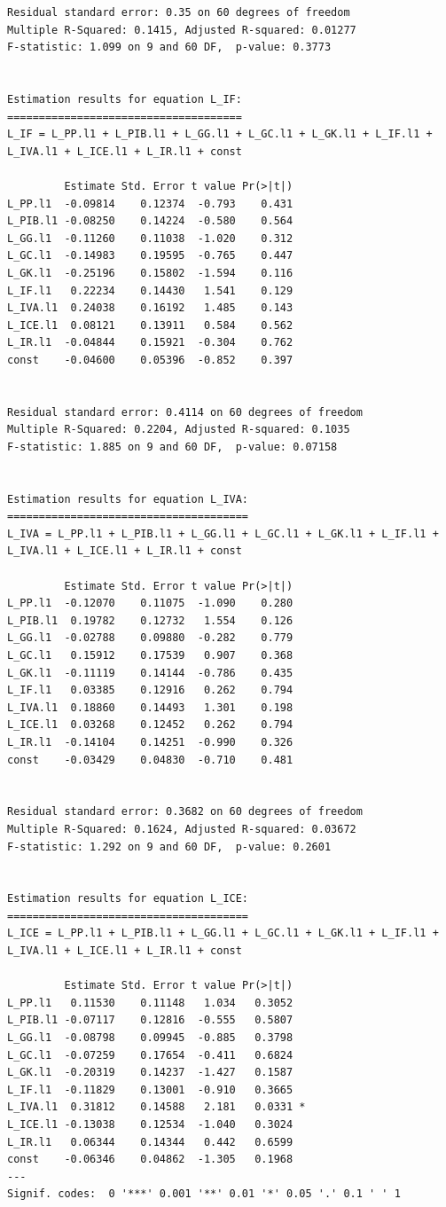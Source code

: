 \documentclass[
  spanish,
  letterpaper,
  DIV=11,
  numbers=noendperiod]{scrartcl}
\begin{document}
\begin{verbatim}
Residual standard error: 0.35 on 60 degrees of freedom
Multiple R-Squared: 0.1415, Adjusted R-squared: 0.01277 
F-statistic: 1.099 on 9 and 60 DF,  p-value: 0.3773 


Estimation results for equation L_IF: 
===================================== 
L_IF = L_PP.l1 + L_PIB.l1 + L_GG.l1 + L_GC.l1 + L_GK.l1 + L_IF.l1 + L_IVA.l1 + L_ICE.l1 + L_IR.l1 + const 

         Estimate Std. Error t value Pr(>|t|)
L_PP.l1  -0.09814    0.12374  -0.793    0.431
L_PIB.l1 -0.08250    0.14224  -0.580    0.564
L_GG.l1  -0.11260    0.11038  -1.020    0.312
L_GC.l1  -0.14983    0.19595  -0.765    0.447
L_GK.l1  -0.25196    0.15802  -1.594    0.116
L_IF.l1   0.22234    0.14430   1.541    0.129
L_IVA.l1  0.24038    0.16192   1.485    0.143
L_ICE.l1  0.08121    0.13911   0.584    0.562
L_IR.l1  -0.04844    0.15921  -0.304    0.762
const    -0.04600    0.05396  -0.852    0.397


Residual standard error: 0.4114 on 60 degrees of freedom
Multiple R-Squared: 0.2204, Adjusted R-squared: 0.1035 
F-statistic: 1.885 on 9 and 60 DF,  p-value: 0.07158 


Estimation results for equation L_IVA: 
====================================== 
L_IVA = L_PP.l1 + L_PIB.l1 + L_GG.l1 + L_GC.l1 + L_GK.l1 + L_IF.l1 + L_IVA.l1 + L_ICE.l1 + L_IR.l1 + const 

         Estimate Std. Error t value Pr(>|t|)
L_PP.l1  -0.12070    0.11075  -1.090    0.280
L_PIB.l1  0.19782    0.12732   1.554    0.126
L_GG.l1  -0.02788    0.09880  -0.282    0.779
L_GC.l1   0.15912    0.17539   0.907    0.368
L_GK.l1  -0.11119    0.14144  -0.786    0.435
L_IF.l1   0.03385    0.12916   0.262    0.794
L_IVA.l1  0.18860    0.14493   1.301    0.198
L_ICE.l1  0.03268    0.12452   0.262    0.794
L_IR.l1  -0.14104    0.14251  -0.990    0.326
const    -0.03429    0.04830  -0.710    0.481


Residual standard error: 0.3682 on 60 degrees of freedom
Multiple R-Squared: 0.1624, Adjusted R-squared: 0.03672 
F-statistic: 1.292 on 9 and 60 DF,  p-value: 0.2601 


Estimation results for equation L_ICE: 
====================================== 
L_ICE = L_PP.l1 + L_PIB.l1 + L_GG.l1 + L_GC.l1 + L_GK.l1 + L_IF.l1 + L_IVA.l1 + L_ICE.l1 + L_IR.l1 + const 

         Estimate Std. Error t value Pr(>|t|)  
L_PP.l1   0.11530    0.11148   1.034   0.3052  
L_PIB.l1 -0.07117    0.12816  -0.555   0.5807  
L_GG.l1  -0.08798    0.09945  -0.885   0.3798  
L_GC.l1  -0.07259    0.17654  -0.411   0.6824  
L_GK.l1  -0.20319    0.14237  -1.427   0.1587  
L_IF.l1  -0.11829    0.13001  -0.910   0.3665  
L_IVA.l1  0.31812    0.14588   2.181   0.0331 *
L_ICE.l1 -0.13038    0.12534  -1.040   0.3024  
L_IR.l1   0.06344    0.14344   0.442   0.6599  
const    -0.06346    0.04862  -1.305   0.1968  
---
Signif. codes:  0 '***' 0.001 '**' 0.01 '*' 0.05 '.' 0.1 ' ' 1



\end{verbatim}
\end{document}
